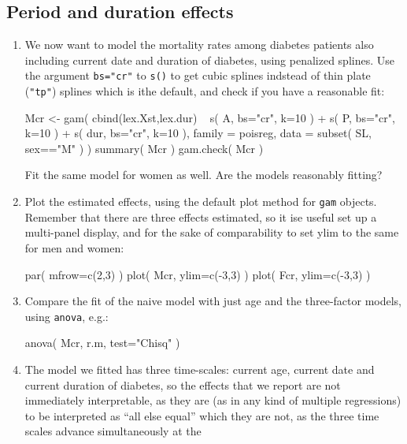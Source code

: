 \subsection*{Period and duration effects}
\begin{enumerate}[resume]
\item We now want to model the mortality rates among diabetes patients
  also including current date and duration of diabetes, using penalized
  splines.  Use the argument \texttt{bs="cr"} to \texttt{s()} to get
  cubic splines indstead of thin plate (\texttt{"tp"}) splines which is
  ithe default, and check if you have a reasonable fit:
\begin{Schunk}
\begin{Sinput}
 Mcr <- gam( cbind(lex.Xst,lex.dur) ~ s(   A, bs="cr", k=10 ) +
                                      s(   P, bs="cr", k=10 ) +
                                      s( dur, bs="cr", k=10 ),
             family = poisreg,
               data = subset( SL, sex=="M" ) )
 summary( Mcr )
 gam.check( Mcr )
\end{Sinput}
\end{Schunk}
Fit the same model for women as well. Are the models reasonably fitting?
\item Plot the estimated effects, using the default plot method for
  \texttt{gam} objects. Remember that there are three effects
  estimated, so it ise useful set up a multi-panel display, and for
  the sake of comparability to set ylim to the same for men and women:
\begin{Schunk}
\begin{Sinput}
 par( mfrow=c(2,3) )
 plot( Mcr, ylim=c(-3,3) )
 plot( Fcr, ylim=c(-3,3) )
\end{Sinput}
\end{Schunk}
\item Compare the fit of the naive model with just age and the
  three-factor models, using \texttt{anova}, e.g.:
\begin{Schunk}
\begin{Sinput}
 anova( Mcr, r.m, test="Chisq" )
\end{Sinput}
\end{Schunk}
\item The model we fitted has three time-scales: current age, current
  date and current duration of diabetes, so the effects that we report
  are not immediately interpretable, as they are (as in any kind of
  multiple regressions) to be interpreted as ``all else equal'' which
  they are not, as the three time scales advance simultaneously at the

\end{enumerate}
